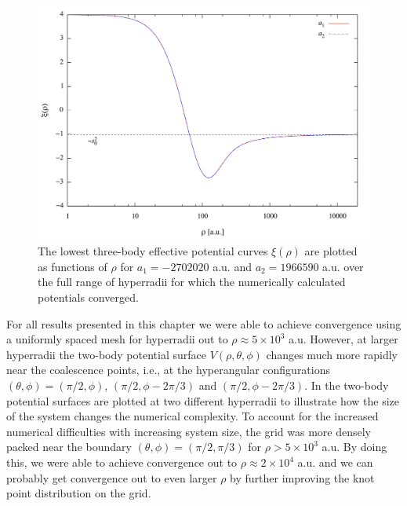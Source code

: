 \begin{figure}[h!]
	\includegraphics[width=\linewidth]{infty.pdf}
	\caption{The lowest three-body effective potential curves $\xi(\rho)$ are plotted as functions of $\rho$ for $a_1 = -2702020$ a.u. and $a_2 = 1966590$ a.u. over the full range of hyperradii for which the numerically calculated potentials converged.}
	\label{fig:infty}
\end{figure}

For all results presented in this chapter we were able to achieve convergence using a uniformly spaced mesh for hyperradii out to $\rho \approx 5 \times 10^3$ a.u. However, at larger hyperradii the two-body potential surface $V(\rho,\theta,\phi)$ changes much more rapidly near the coalescence points, i.e., at the hyperangular configurations $(\theta,\phi) = (\pi/2,\phi)$, $(\pi/2,\phi - 2\pi/3)$ and $(\pi/2,\phi - 2\pi/3)$. In  the two-body potential surfaces are plotted at two different hyperradii to illustrate how the size of the system changes the numerical complexity. To account for the increased numerical difficulties with increasing system size, the grid was more densely packed near the boundary $(\theta,\phi)=(\pi/2,\pi/3)$ for $\rho > 5 \times 10^3$ a.u. By doing this, we were able to achieve convergence out to $\rho \approx 2 \times 10^4$ a.u. and we can probably get convergence out to even larger $\rho$ by further improving the knot point distribution on the grid.

